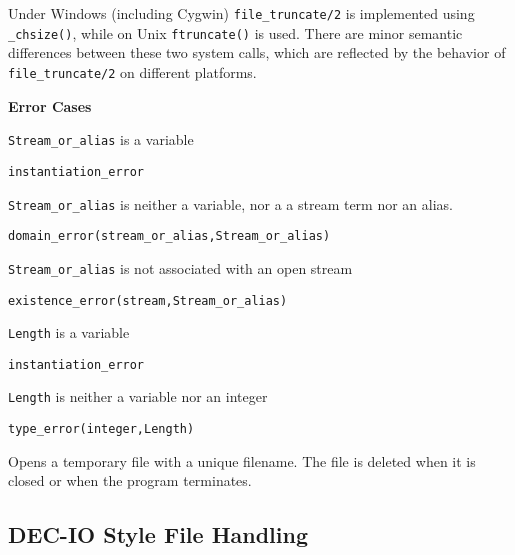 \begin{description}
\portability Under Windows (including Cygwin) {\tt file\_truncate/2}
is implemented using {\tt \_chsize()}, while on Unix {\tt ftruncate()}
is used.  There are minor semantic differences between these two
system calls, which are reflected by the behavior of {\tt
file\_truncate/2} on different platforms.

{\bf Error Cases}
\bi
\item 	{\tt Stream\_or\_alias} is a variable
\bi
\item {\tt instantiation\_error}
\ei
\item {\tt Stream\_or\_alias} is neither a variable, nor a a stream
  term nor an alias.  
\bi
\item 	{\tt domain\_error(stream\_or\_alias,Stream\_or\_alias)}
\ei
\item 	{\tt Stream\_or\_alias} is not associated with an open stream
\bi
\item 	{\tt existence\_error(stream,Stream\_or\_alias)}
\ei
\item {\tt Length} is a variable
\bi
\item {\tt instantiation\_error}
\ei
\item {\tt Length} is neither a variable nor an integer
\bi
\item 	{\tt type\_error(integer,Length)}
\ei
\ei
{}

    Opens a temporary file with a unique filename. The file is deleted
    when it is closed or when the program terminates.

\end{description}

\subsection{DEC-IO Style File Handling}

